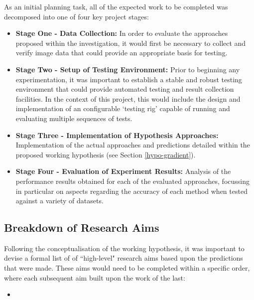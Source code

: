 As an initial planning task, all of the expected work to be completed was decomposed into one of four key project stages:

\begin{itemize}
	\item \textbf{Stage One - Data Collection:} In order to evaluate the approaches proposed within the investigation, it would first be necessary to collect and verify image data that could provide an appropriate basis for testing.
	\item \textbf{Stage Two - Setup of Testing Environment:} Prior to beginning any experimentation, it was important to establish a stable and robust testing environment that could provide automated testing and result collection facilities. In the context of this project, this would include the design and implementation of an configurable `testing rig' capable of running and evaluating multiple sequences of tests.
	\item \textbf{Stage Three - Implementation of Hypothesis Approaches:} Implementation of the actual approaches and predictions detailed within the proposed working hypothesis (see Section \ref{hypo-gradient}).
	\item \textbf{Stage Four - Evaluation of Experiment Results:} Analysis of the performance results obtained for each of the evaluated approaches, focussing in particular on aspects regarding the accuracy of each method when tested against a variety of datasets.
\end{itemize}  

\subsection{Breakdown of Research Aims}

Following the conceptualisation of the working hypothesis, it was important to devise a formal list of of ``high-level" research aims based upon the predictions that were made. These aims would need to be completed within a specific order, where each subsequent aim built upon the work of the last:

\begin{itemize}
	\item 
\end{itemize}

  

%
%



